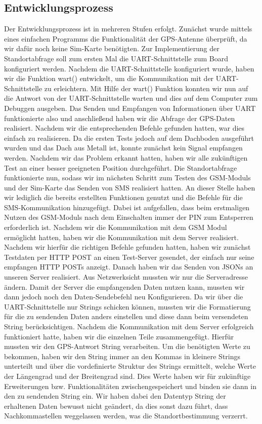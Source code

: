 \subsection{Entwicklungsprozess}
Der Entwicklungsprozess ist in mehreren Stufen erfolgt. 
Zunächst wurde mittels eines einfachen Programms die Funktionalität der GPS-Antenne überprüft, da wir dafür noch keine Sim-Karte benötigten. Zur Implementierung der Standortabfrage soll zum ersten Mal die UART-Schnittstelle zum Board konfiguriert werden. Nachdem die UART-Schnittstelle konfiguriert wurde, haben wir die Funktion wart() entwickelt, um die Kommunikation mit der UART-Schnittstelle zu erleichtern. Mit Hilfe der wart() Funktion konnten wir nun auf die Antwort von der UART-Schnittstelle warten und dies auf dem Computer zum Debuggen ausgeben. Das Senden und Empfangen von Informationen über UART funktionierte also und anschließend haben wir die Abfrage der GPS-Daten realisiert. Nachdem wir die entsprechenden Befehle gefunden hatten, war dies einfach zu realisieren.
Da die ersten Tests jedoch auf dem Dachboden ausgeführt wurden und das Dach aus Metall ist, konnte zunächst kein Signal empfangen werden. Nachdem wir das Problem erkannt hatten, haben wir alle zukünftigen Test an einer besser geeigneten Position durchgeführt.
Die Standortabfrage funktionierte nun, sodass wir im nächsten Schritt zum Testen des GSM-Moduls und der Sim-Karte das Senden von SMS realisiert hatten. An dieser Stelle haben wir lediglich die bereits erstellten Funktionen genutzt und die Befehle für die SMS-Kommunikation hinzugefügt. Dabei ist aufgefallen, dass beim erstmaligen Nutzen des GSM-Moduls nach dem Einschalten immer der PIN zum Entsperren erforderlich ist. 
Nachdem wir die Kommunikation mit dem GSM Modul ermöglicht hatten, haben wir die Kommunikation mit dem Server realisiert.
Nachdem wir hierfür die richtigen Befehle gefunden hatten, haben wir zunächst Testdaten per HTTP POST an einen Test-Server gesendet, der einfach nur seine empfangen HTTP POSTs anzeigt. Danach haben wir das Senden von JSONs an unseren Server realisiert. Aus Netzwerksicht mussten wir nur die Serveradresse ändern.  Damit der Server die empfangenden Daten nutzen kann, mussten wir dann jedoch noch den Daten-Sendebefehl neu Konfigurieren. Da wir über die UART-Schnittstelle nur Strings schicken können, mussten wir die Formatierung für die zu sendenden Daten anders einstellen und diese  dann beim versendeten String berücksichtigen. 
Nachdem die Kommunikation mit dem Server erfolgreich funktioniert hatte, haben wir die einzelnen Teile zusammengefügt. Hierfür mussten wir den GPS-Antwort String verarbeiten. Um die benötigten Werte zu bekommen, haben wir den String immer an den Kommas in kleinere Strings unterteilt und über die vordefinierte Struktur des Strings ermittelt, welche Werte der Längengrad und der Breitengrad sind. Dies Werte haben wir für zukünftige Erweiterungen bzw. Funktionalitäten zwischengespeichert und binden sie dann in den zu sendenden String ein.
Wir haben dabei den Datentyp String der erhaltenen Daten bewusst nicht geändert, da dies sonst dazu führt, dass Nachkommastellen weggelassen werden, was die Standortbestimmung verzerrt.

